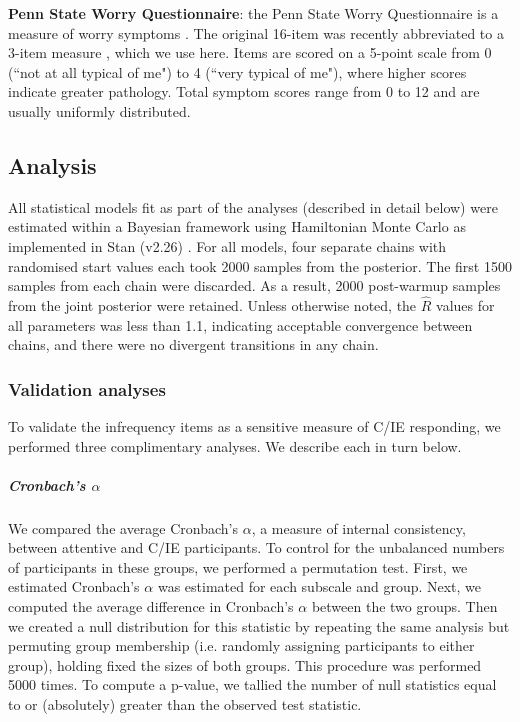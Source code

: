 \documentclass[a4paper,notitlepage,12pt]{article}
\begin{document}
\begin{refsection}[main]
\textbf{Penn State Worry Questionnaire}: the Penn State Worry Questionnaire is a measure of worry symptoms \cite{meyer1990development}. The original 16-item was recently abbreviated to a 3-item measure \cite{kertz2014psychometric}, which we use here. Items are scored on a 5-point scale from 0 (``not at all typical of me") to 4 (``very typical of me"), where higher scores indicate greater pathology. Total symptom scores range from 0 to 12 and are usually uniformly distributed.

\subsection{Analysis}

All statistical models fit as part of the analyses (described in detail below) were estimated within a Bayesian framework using Hamiltonian Monte Carlo as implemented in Stan (v2.26) \cite{stan}. For all models, four separate chains with randomised start values each took 2000 samples from the posterior. The first 1500 samples from each chain were discarded. As a result, 2000 post-warmup samples from the joint posterior were retained. Unless otherwise noted, the $\hat{R}$ values for all parameters was less than 1.1, indicating acceptable convergence between chains, and there were no divergent transitions in any chain. 

\subsubsection{Validation analyses}

To validate the infrequency items as a sensitive measure of C/IE responding, we performed three complimentary analyses. We describe each in turn below.

\subparagraph{Cronbach's $\alpha$} We compared the average Cronbach's $\alpha$, a measure of internal consistency, between attentive and C/IE participants. To control for the unbalanced numbers of participants in these groups, we performed a permutation test. First, we estimated Cronbach's $\alpha$ was estimated for each subscale and group. Next, we computed the average difference in Cronbach's $\alpha$ between the two groups. Then we created a null distribution for this statistic by repeating the same analysis but permuting group membership (i.e. randomly assigning participants to either group), holding fixed the sizes of both groups. This procedure was performed 5000 times. To compute a p-value, we tallied the number of null statistics equal to or (absolutely) greater than the observed test statistic. 


\end{refsection}
\end{document}
